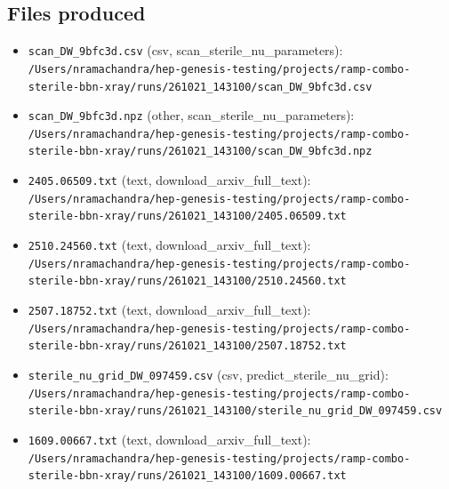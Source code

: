 \documentclass[11pt,a4paper]{article}
\begin{document}
\subsection{Files produced}
\begin{itemize}
  \item \texttt{scan\_\allowbreak{}DW\_\allowbreak{}9bfc3d.csv} (csv, scan\_sterile\_nu\_parameters): \texttt{/\allowbreak{}Users/\allowbreak{}nramachandra/\allowbreak{}hep-genesis-testing/\allowbreak{}projects/\allowbreak{}ramp-combo-sterile-bbn-xray/\allowbreak{}runs/\allowbreak{}261021\_\allowbreak{}143100/\allowbreak{}scan\_\allowbreak{}DW\_\allowbreak{}9bfc3d.csv}
  \item \texttt{scan\_\allowbreak{}DW\_\allowbreak{}9bfc3d.npz} (other, scan\_sterile\_nu\_parameters): \texttt{/\allowbreak{}Users/\allowbreak{}nramachandra/\allowbreak{}hep-genesis-testing/\allowbreak{}projects/\allowbreak{}ramp-combo-sterile-bbn-xray/\allowbreak{}runs/\allowbreak{}261021\_\allowbreak{}143100/\allowbreak{}scan\_\allowbreak{}DW\_\allowbreak{}9bfc3d.npz}
  \item \texttt{2405.06509.txt} (text, download\_arxiv\_full\_text): \texttt{/\allowbreak{}Users/\allowbreak{}nramachandra/\allowbreak{}hep-genesis-testing/\allowbreak{}projects/\allowbreak{}ramp-combo-sterile-bbn-xray/\allowbreak{}runs/\allowbreak{}261021\_\allowbreak{}143100/\allowbreak{}2405.06509.txt}
  \item \texttt{2510.24560.txt} (text, download\_arxiv\_full\_text): \texttt{/\allowbreak{}Users/\allowbreak{}nramachandra/\allowbreak{}hep-genesis-testing/\allowbreak{}projects/\allowbreak{}ramp-combo-sterile-bbn-xray/\allowbreak{}runs/\allowbreak{}261021\_\allowbreak{}143100/\allowbreak{}2510.24560.txt}
  \item \texttt{2507.18752.txt} (text, download\_arxiv\_full\_text): \texttt{/\allowbreak{}Users/\allowbreak{}nramachandra/\allowbreak{}hep-genesis-testing/\allowbreak{}projects/\allowbreak{}ramp-combo-sterile-bbn-xray/\allowbreak{}runs/\allowbreak{}261021\_\allowbreak{}143100/\allowbreak{}2507.18752.txt}
  \item \texttt{sterile\_\allowbreak{}nu\_\allowbreak{}grid\_\allowbreak{}DW\_\allowbreak{}097459.csv} (csv, predict\_sterile\_nu\_grid): \texttt{/\allowbreak{}Users/\allowbreak{}nramachandra/\allowbreak{}hep-genesis-testing/\allowbreak{}projects/\allowbreak{}ramp-combo-sterile-bbn-xray/\allowbreak{}runs/\allowbreak{}261021\_\allowbreak{}143100/\allowbreak{}sterile\_\allowbreak{}nu\_\allowbreak{}grid\_\allowbreak{}DW\_\allowbreak{}097459.csv}
  \item \texttt{1609.00667.txt} (text, download\_arxiv\_full\_text): \texttt{/\allowbreak{}Users/\allowbreak{}nramachandra/\allowbreak{}hep-genesis-testing/\allowbreak{}projects/\allowbreak{}ramp-combo-sterile-bbn-xray/\allowbreak{}runs/\allowbreak{}261021\_\allowbreak{}143100/\allowbreak{}1609.00667.txt}

\end{itemize}
\end{document}
